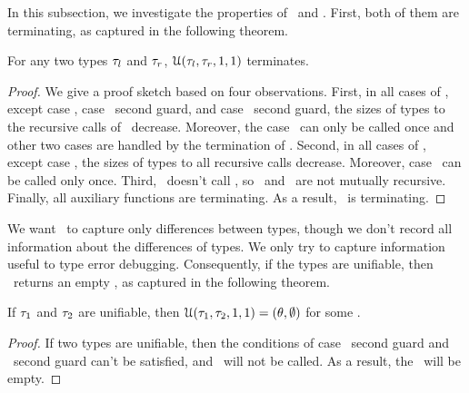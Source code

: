 \documentclass[12pt]{report}	%
\begin{document}
In this subsection, we investigate the properties of \ualg\ and \dalg. First, both of
them are terminating, as captured in the following theorem.

\begin{theorem}
For any two types $\tau_l$ and $\tau_r$, $\mathcal U(\tau_l,\tau_r,1,1)$ terminates.
\end{theorem}
%
\begin{proof}
We give a proof sketch based on four observations.
First, in all cases of \ualg,
except case \namevb, case \nameva\ second guard, and case \nameve\
second guard, the sizes of types to the recursive calls of \ualg\
decrease. Moreover, the case \namevb\ can only be called once and
other two cases are handled by the termination of \dalg.
Second, in all cases of \dalg, except case \namevg, the sizes of
types to all recursive calls decrease. Moreover, case \namevg\ can
be called only once. Third, \dalg\ doesn't call \ualg, so \ualg\ and \dalg\
are not mutually recursive. Finally, all auxiliary functions are terminating.
As a result, \ualg\ is terminating.
\end{proof}

We want \td\ to capture only  differences
between types, though we don't
record all information about the
differences of types. We only
try to capture information useful
to type error debugging.
Consequently, if the types are unifiable, then \ualg\ returns an empty \td, as captured in the
following theorem.
%
\begin{theorem}
\label{the:sound}
If $\tau_1$ and $\tau_2$ are unifiable,
then $\mathcal U(\tau_1,\tau_2,1,1)=(\theta,\emptyset)$ for some \subtt.
\end{theorem}

\begin{proof}
If two types are unifiable, then the conditions of
case \nameva\ second guard and
\nameve\ second guard can't be satisfied, and \dalg\ will not
be called. As a result, the \td\ will be empty.
\end{proof}
\end{document}
